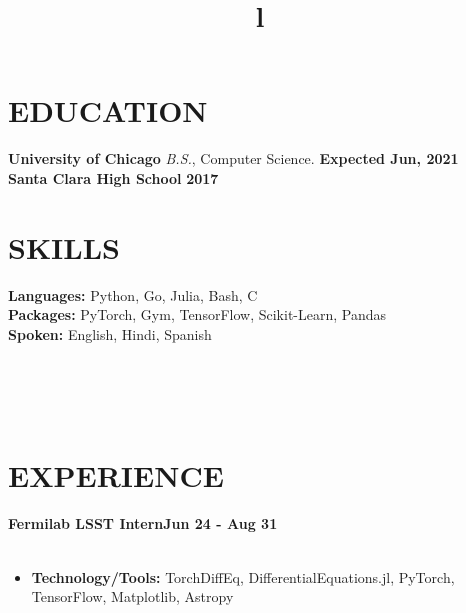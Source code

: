 \documentclass[margin]{res}
\begin{document}
\begin{resume}

\section{EDUCATION}
\textbf{University of Chicago}
{\sl B.S.}, Computer Science. \hfill \textbf{Expected Jun, 2021}\\
\textbf{Santa Clara High School} \hfill \textbf{2017}
\section{SKILLS}
\textbf{Languages:} Python, Go, Julia, Bash, C\\
\textbf{Packages:} PyTorch, Gym, TensorFlow, Scikit-Learn, Pandas \\
\textbf{Spoken:} English, Hindi, Spanish

\begin{format}
\title{l}\\
\\
\body\\
\end{format}
\section{EXPERIENCE}
\textbf{Fermilab LSST Intern\hfill Jun 24 - Aug 31}\\
\\
\begin{itemize}
    \item \textbf{Technology/Tools:} TorchDiffEq, DifferentialEquations.jl, PyTorch, TensorFlow, Matplotlib, Astropy
\end{itemize}

\end{resume}
\end{document}
